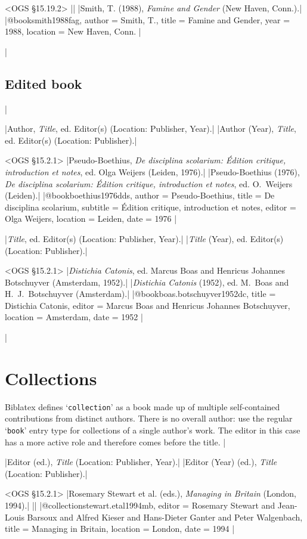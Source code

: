 \documentclass[extrafontsizes,11pt,a4paper,oneside]{memoir}
\newcommand*{\lit}[1]{\textsf{#1}}
\newcommand*{\code}[1]{`\texttt{#1}'}
\begin{document}
\bibexample<OGS \S15.19.2>
||%
|Smith, T. (1988), \emph{Famine and Gender} (New Haven, Conn.).|%
|@book{smith1988fag,
  author = {Smith, T.},
  title = {Famine and Gender},
  year = {1988},
  location = {New Haven, Conn.}
}|

\todoc|
\subsection{Edited book}
|

\specs
|Author, \emph{Title}, \lit{ed.} Editor(s) (Location: Publisher, Year).|%
|Author (Year), \emph{Title}, \lit{ed.} Editor(s) (Location: Publisher).|

\bibexample<OGS \S15.2.1>
|Pseudo-Boethius, \emph{De disciplina scolarium: Édition critique, introduction et notes}, ed. Olga Weijers (Leiden, 1976).|%
|Pseudo-Boethius (1976), \emph{De disciplina scolarium: Édition critique, introduction et notes}, ed. O.\ Weijers (Leiden).|%
|@book{boethius1976dds,
  author = {Pseudo-Boethius},
  title = {De disciplina scolarium},
  subtitle = {Édition critique, introduction et notes},
  editor = {Olga Weijers},
  location = {Leiden},
  date = {1976}
}|

\specs
|\emph{Title}, \lit{ed.} Editor(s) (Location: Publisher, Year).|%
|\emph{Title} (Year), \lit{ed.} Editor(s) (Location: Publisher).|

\bibexample<OGS \S15.2.1>
|\emph{Distichia Catonis}, ed. Marcus Boas and Henricus Johannes Botschuyver (Amsterdam, 1952).|%
|\emph{Distichia Catonis} (1952), ed. M.\ Boas and H.\ J.\ Botschuyver (Amsterdam).|%
|@book{boas.botschuyver1952dc,
  title = {Distichia Catonis},
  editor = {Marcus Boas and Henricus Johannes Botschuyver},
  location = {Amsterdam},
  date = {1952}
}|

\todoc|
\section{Collections}

Biblatex defines \code{collection} as a book made up of multiple self-contained contributions from distinct authors. There is no overall author: use the regular \code{book} entry type for collections of a single author’s work. The editor in this case has a more active role and therefore comes before the title.
|

\specs
|Editor (\lit{ed.}), \emph{Title} (Location: Publisher, Year).|%
|Editor (Year) (\lit{ed.}), \emph{Title} (Location: Publisher).|

\bibexample<OGS \S15.2.1>
|Rosemary Stewart et al. (eds.), \emph{Managing in Britain} (London, 1994).|%
||%
|@collection{stewart.etal1994mb,
  editor = {Rosemary Stewart and Jean-Louis Barsoux and Alfred Kieser and Hans-Dieter Ganter and Peter Walgenbach},
  title = {Managing in {Britain}},
  location = {London},
  date = {1994}
}|
\end{document}
